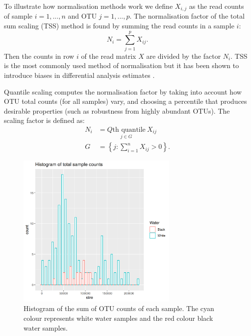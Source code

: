  To illustrate how normalisation methods work we define $X_{i,j}$ as the read counts of sample  $i =1,...,n$ and OTU $j=1,...,p$. The normalisation factor of the total sum scaling (TSS) method is found by summing the read counts in a sample $i$:
 \begin{equation}
 	N_i = \sum_{j=1}^{p} X_{ij}.
 \end{equation}
Then the counts in row $i$ of the read matrix $X$ are divided by the factor $N_i$. TSS is the most commonly used method of normalisation but it has been shown to introduce biases in differential analysis estimates \cite{bullard_evaluation_2010}.

Quantile scaling computes the normalisation factor by taking into account how OTU total counts (for all samples) vary, and choosing a percentile that produces desirable properties (such as robustness from highly abundant OTUs).
The scaling factor is defined as:
\begin{align}
	N_i &= \underset{ j \in G}{ Q\text{th quantile}} \  X_{ij}\\
	G  &= \left\{ j : \sum_{i = 1}^{n} X_{ij} > 0\right\}.
\end{align}

 
\begin{figure}[htb]
\centering
\includegraphics[width = 0.7\textwidth]{histogramofcountdata}
\caption{Histogram of the sum of OTU counts of each sample. The cyan colour represents white water samples and the red colour black water samples.}
\label{fig:counthistogram}
\end{figure}

